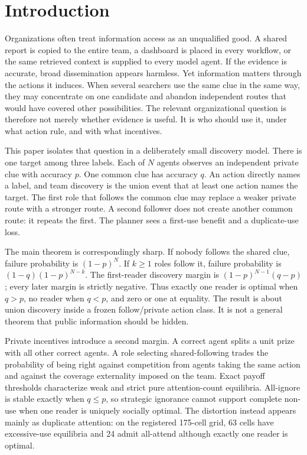 \documentclass[11pt]{article}
\begin{document}


\section{Introduction}

Organizations often treat information access as an unqualified good. A shared
report is copied to the entire team, a dashboard is placed in every workflow,
or the same retrieved context is supplied to every model agent. If the evidence
is accurate, broad dissemination appears harmless. Yet information matters
through the actions it induces. When several searchers use the same clue in the
same way, they may concentrate on one candidate and abandon independent routes
that would have covered other possibilities. The relevant organizational
question is therefore not merely whether evidence is useful. It is who should
use it, under what action rule, and with what incentives.

This paper isolates that question in a deliberately small discovery model.
There is one target among three labels. Each of $N$ agents observes an
independent private clue with accuracy $p$. One common clue has accuracy $q$.
An action directly names a label, and team discovery is the union event that
at least one action names the target. The first role that follows the common
clue may replace a weaker private route with a stronger route. A second follower
does not create another common route: it repeats the first. The planner sees a
first-use benefit and a duplicate-use loss.

The main theorem is correspondingly sharp. If nobody follows the shared clue,
failure probability is $(1-p)^N$. If $k\geq1$ roles follow it, failure probability
is $(1-q)(1-p)^{N-k}$. The first-reader discovery margin is
$(1-p)^{N-1}(q-p)$; every later margin is strictly negative. Thus exactly one
reader is optimal when $q>p$, no reader when $q<p$, and zero or one at equality.
The result is about union discovery inside a frozen follow/private action class.
It is not a general theorem that public information should be hidden.

Private incentives introduce a second margin. A correct agent splits a unit
prize with all other correct agents. A role selecting shared-following trades
the probability of being right against competition from agents taking the same
action and against the coverage externality imposed on the team. Exact payoff
thresholds characterize weak and strict pure attention-count equilibria.
All-ignore is stable exactly when $q\leq p$, so strategic ignorance cannot
support complete non-use when one reader is uniquely socially optimal. The
distortion instead appears mainly as duplicate attention: on the registered
175-cell grid, 63 cells have excessive-use equilibria and 24 admit all-attend
although exactly one reader is optimal.
\end{document}
